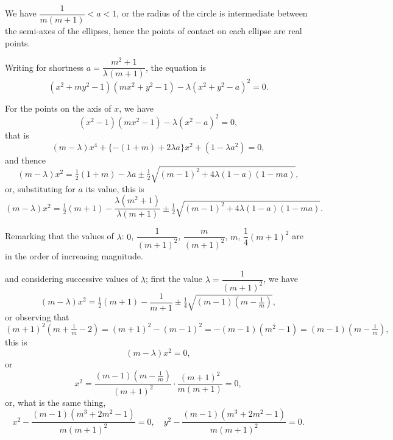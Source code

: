 \documentclass[11pt,a4paper]{article}
\theoremstyle{plain}
\begin{document}
We have $\dfrac{1}{m(m+1)} < a < 1$, or the radius of the circle is intermediate between the semi-axes of the ellipses, hence the points of contact on each ellipse are real points.

Writing for shortness $a = \dfrac{m^2+1}{\lambda(m+1)}$, the equation is
\begin{equation}
(x^2 + my^2 - 1)(mx^2 + y^2 - 1) - \lambda(x^2 + y^2 - a)^2 = 0.
\end{equation}

For the points on the axis of $x$, we have
\begin{equation}
(x^2 - 1)(mx^2 - 1) - \lambda(x^2 - a)^2 = 0,
\end{equation}
that is
\begin{equation}
(m - \lambda)x^4 + \{-(1+m) + 2\lambda a\}x^2 + (1 - \lambda a^2) = 0,
\end{equation}
and thence
\begin{equation}
(m - \lambda)x^2 = \tfrac{1}{2}(1+m) - \lambda a \pm \tfrac{1}{2}\sqrt{(m-1)^2 + 4\lambda(1-a)(1-ma)},
\end{equation}
or, substituting for $a$ its value, this is
\begin{equation}
(m-\lambda)x^2 = \tfrac{1}{2}(m+1) - \frac{\lambda(m^2+1)}{\lambda(m+1)} \pm \tfrac{1}{2}\sqrt{(m-1)^2 + 4\lambda(1-a)(1-ma)}.
\end{equation}

Remarking that the values of $\lambda$: $0$, $\dfrac{1}{(m+1)^2}$, $\dfrac{m}{(m+1)^2}$, $m$, $\dfrac{1}{4}(m+1)^2$ are in the order of increasing magnitude.

\newpage
\setcounter{equation}{8}

and considering successive values of $\lambda$; first the value $\lambda = \dfrac{1}{(m+1)^2}$, we have
\begin{equation}
(m-\lambda)x^2 = \tfrac{1}{2}(m+1) - \frac{1}{m+1} \pm \tfrac{1}{4}\sqrt{(m-1)(m-\tfrac{1}{m})},
\end{equation}
or observing that
\begin{equation}
(m+1)^2(m + \tfrac{1}{m} - 2) = (m+1)^2 - (m-1)^2 = -(m-1)(m^2-1) = (m-1)(m-\tfrac{1}{m}),
\end{equation}
this is
\begin{equation}
(m-\lambda)x^2 = 0,
\end{equation}
or
\begin{equation}
x^2 = \frac{(m-1)(m-\tfrac{1}{m})}{(m+1)^2} \cdot \frac{(m+1)^2}{m(m+1)} = 0,
\end{equation}
or, what is the same thing,
\begin{equation}
x^2 - \frac{(m-1)(m^3 + 2m^2 - 1)}{m(m+1)^2} = 0, \quad y^2 - \frac{(m-1)(m^3 + 2m^2 - 1)}{m(m+1)^2} = 0.
\end{equation}
\end{document}
